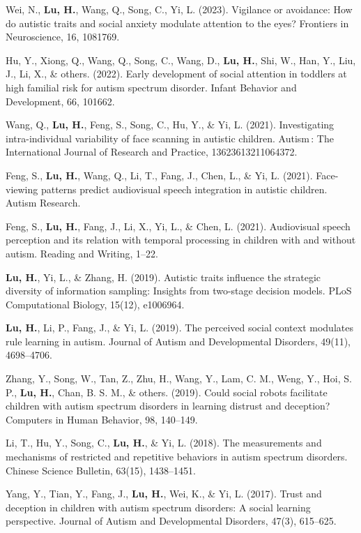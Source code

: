 \newcommand{\Revision}{\textit{Under revision}}
\newcommand{\Review}{\textit{Under review}}
\newcommand{\Submitted}{\textit{Submitted}}
\newcommand{\Manuscript}{\textit{Preparing manuscript}}
\newcommand{\CS}{*} %
\newcommand{\CF}{\textsuperscript{\#}} %
\newcommand{\ME}{\textbf{Lu, H.}}


\begin{etaremune}
  \item Wei, N., \ME, Wang, Q., Song, C., Yi, L. (2023). Vigilance or avoidance: How do autistic traits and social anxiety modulate attention to the eyes? Frontiers in Neuroscience, 16, 1081769.
  \item Hu, Y., Xiong, Q., Wang, Q., Song, C., Wang, D., \ME, Shi, W., Han, Y., Liu, J., Li, X., \& others. (2022). Early development of social attention in toddlers at high familial risk for autism spectrum disorder. Infant Behavior and Development, 66, 101662.
  \item Wang, Q., \ME, Feng, S., Song, C., Hu, Y., \& Yi, L. (2021). Investigating intra-individual variability of face scanning in autistic children. Autism : The International Journal of Research and Practice, 13623613211064372.
  \item Feng, S., \ME, Wang, Q., Li, T., Fang, J., Chen, L., \& Yi, L. (2021). Face-viewing patterns predict audiovisual speech integration in autistic children. Autism Research.
  \item Feng, S., \ME, Fang, J., Li, X., Yi, L., \& Chen, L. (2021). Audiovisual speech perception and its relation with temporal processing in children with and without autism. Reading and Writing, 1–22.
  \item \ME, Yi, L., \& Zhang, H. (2019). Autistic traits influence the strategic diversity of information sampling: Insights from two-stage decision models. PLoS Computational Biology, 15(12), e1006964.
  \item \ME, Li, P., Fang, J., \& Yi, L. (2019). The perceived social context modulates rule learning in autism. Journal of Autism and Developmental Disorders, 49(11), 4698–4706.
  \item Zhang, Y., Song, W., Tan, Z., Zhu, H., Wang, Y., Lam, C. M., Weng, Y., Hoi, S. P., \ME, Chan, B. S. M., \& others. (2019). Could social robots facilitate children with autism spectrum disorders in learning distrust and deception? Computers in Human Behavior, 98, 140–149.
  \item Li, T., Hu, Y., Song, C., \ME, \& Yi, L. (2018). The measurements and mechanisms of restricted and repetitive behaviors in autism spectrum disorders. Chinese Science Bulletin, 63(15), 1438–1451.
  \item Yang, Y., Tian, Y., Fang, J., \ME, Wei, K., \& Yi, L. (2017). Trust and deception in children with autism spectrum disorders: A social learning perspective. Journal of Autism and Developmental Disorders, 47(3), 615–625.

\end{etaremune}
